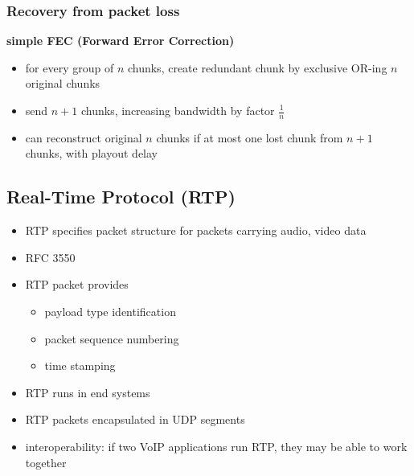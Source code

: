 \subsubsection{Recovery from packet loss}
\textbf{simple FEC (Forward Error Correction)}
\begin{itemize}
	\item for every group of $n$ chunks, create redundant chunk by exclusive OR-ing $n$ original chunks
	\item send $n+1$ chunks, increasing bandwidth by factor $\frac{1}{n}$
	\item can reconstruct original $n$ chunks if at most one lost chunk from $n+1$ chunks, with playout delay
\end{itemize}

\subsection{Real-Time Protocol (RTP)}
\begin{itemize}
	\item RTP specifies packet structure for packets carrying audio, video data
	\item RFC 3550
	\item RTP packet provides
	\begin{itemize}
		\item payload type identification
		\item packet sequence numbering
		\item time stamping
	\end{itemize}
	\item RTP runs in end systems
	\item RTP packets encapsulated in UDP segments
	\item interoperability: if two VoIP applications run RTP, they may be able to work together
\end{itemize}
